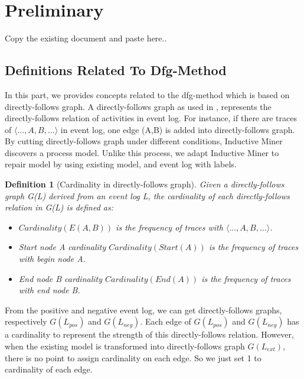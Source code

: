 \documentclass[]{article}
\newtheorem{mydef}{Definition}[section]
\begin{document}
\section{Preliminary}
Copy the existing document and paste here.. 
\subsection{Definitions Related To Dfg-Method}
In this part, we provides concepts related to the dfg-method which is based on directly-follows graph. A directly-follows graph as used in \cite{leemans2013discovering}, represents the directly-follows relation of activities in event log. For instance, if there are traces of $\langle ...,A,B,... \rangle$ in event log, one edge (A,B) is added into directly-follows graph. By cutting directly-follows graph under different conditions, Inductive Miner\cite{leemans2013discovering,leemans2014discovering} discovers a process model. Unlike this process, we adapt Inductive Miner to repair model by using existing model, and event log with labels.

\begin{mydef}[Cardinality in directly-follows graph]
	Given a directly-follows graph G(L) derived from an event log L, the cardinality of each directly-follows relation in G(L) is defined as:  
	\begin{itemize}
		\item $Cardinality(E(A,B))$ is the frequency of traces with $\langle ...,A,B,... \rangle$. 
		\item Start node A cardinality $Cardinality(Start(A))$ is the frequency of traces with begin node A.
		\item End node B cardinality $Cardinality(End(A))$ is the frequency of traces with end node B.
	\end{itemize}	
\end{mydef}
From the positive and negative event log, we can get directly-follows graphs, respectively $G(L_{pos})$ and $G(L_{neg})$. Each edge of  $G(L_{pos})$ and $G(L_{neg})$ has a cardinality to represent the strength of this directly-follows relation. 
However, when the existing model is transformed into  directly-follows graph $G(L_{ext})$, there is no point to assign cardinality on each edge. So we just set 1 to cardinality of each edge. 
\end{document}
